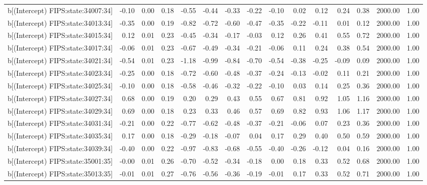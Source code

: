 \begin{table}[ht]
\begin{tabular}{rrrrrrrrrrrrrrr}
  b[(Intercept) FIPS:state:34007:34] & -0.10 & 0.00 & 0.18 & -0.55 & -0.44 & -0.33 & -0.22 & -0.10 & 0.02 & 0.12 & 0.24 & 0.38 & 2000.00 & 1.00 \\ 
  b[(Intercept) FIPS:state:34013:34] & -0.35 & 0.00 & 0.19 & -0.82 & -0.72 & -0.60 & -0.47 & -0.35 & -0.22 & -0.11 & 0.01 & 0.12 & 2000.00 & 1.00 \\ 
  b[(Intercept) FIPS:state:34015:34] & 0.12 & 0.01 & 0.23 & -0.45 & -0.34 & -0.17 & -0.03 & 0.12 & 0.26 & 0.41 & 0.55 & 0.72 & 2000.00 & 1.00 \\ 
  b[(Intercept) FIPS:state:34017:34] & -0.06 & 0.01 & 0.23 & -0.67 & -0.49 & -0.34 & -0.21 & -0.06 & 0.11 & 0.24 & 0.38 & 0.54 & 2000.00 & 1.00 \\ 
  b[(Intercept) FIPS:state:34021:34] & -0.54 & 0.01 & 0.23 & -1.18 & -0.99 & -0.84 & -0.70 & -0.54 & -0.38 & -0.25 & -0.09 & 0.09 & 2000.00 & 1.00 \\ 
  b[(Intercept) FIPS:state:34023:34] & -0.25 & 0.00 & 0.18 & -0.72 & -0.60 & -0.48 & -0.37 & -0.24 & -0.13 & -0.02 & 0.11 & 0.21 & 2000.00 & 1.00 \\ 
  b[(Intercept) FIPS:state:34025:34] & -0.10 & 0.00 & 0.18 & -0.58 & -0.46 & -0.32 & -0.22 & -0.10 & 0.03 & 0.14 & 0.25 & 0.36 & 2000.00 & 1.00 \\ 
  b[(Intercept) FIPS:state:34027:34] & 0.68 & 0.00 & 0.19 & 0.20 & 0.29 & 0.43 & 0.55 & 0.67 & 0.81 & 0.92 & 1.05 & 1.16 & 2000.00 & 1.00 \\ 
  b[(Intercept) FIPS:state:34029:34] & 0.69 & 0.00 & 0.18 & 0.23 & 0.33 & 0.46 & 0.57 & 0.69 & 0.82 & 0.93 & 1.06 & 1.17 & 2000.00 & 1.00 \\ 
  b[(Intercept) FIPS:state:34031:34] & -0.21 & 0.00 & 0.22 & -0.77 & -0.62 & -0.48 & -0.37 & -0.21 & -0.06 & 0.07 & 0.23 & 0.36 & 2000.00 & 1.00 \\ 
  b[(Intercept) FIPS:state:34035:34] & 0.17 & 0.00 & 0.18 & -0.29 & -0.18 & -0.07 & 0.04 & 0.17 & 0.29 & 0.40 & 0.50 & 0.59 & 2000.00 & 1.00 \\ 
  b[(Intercept) FIPS:state:34039:34] & -0.40 & 0.00 & 0.22 & -0.97 & -0.83 & -0.68 & -0.55 & -0.40 & -0.26 & -0.12 & 0.04 & 0.16 & 2000.00 & 1.00 \\ 
  b[(Intercept) FIPS:state:35001:35] & -0.00 & 0.01 & 0.26 & -0.70 & -0.52 & -0.34 & -0.18 & 0.00 & 0.18 & 0.33 & 0.52 & 0.68 & 2000.00 & 1.00 \\ 
  b[(Intercept) FIPS:state:35013:35] & -0.01 & 0.01 & 0.27 & -0.76 & -0.56 & -0.36 & -0.19 & -0.01 & 0.17 & 0.33 & 0.52 & 0.71 & 2000.00 & 1.00 \\ 

\end{tabular}
\end{table}
